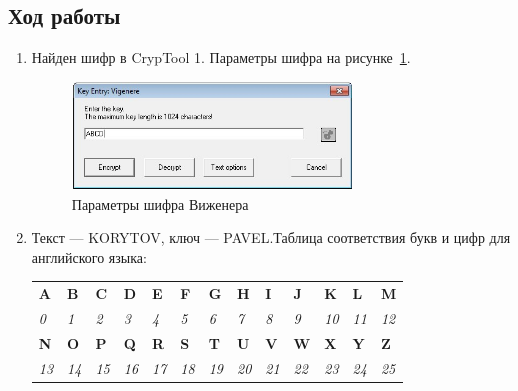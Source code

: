 \documentclass[a4paper, 14pt]{extarticle}
\begin{document}
\subsection{Ход работы}
\begin{enumerate}
    \item Найден шифр в CrypTool 1. Параметры шифра на рисунке~\ref{img:3:1}.
    \begin{figure}[h]
        \centering
        \includegraphics[width=0.7\textwidth]{./img/S010.jpg}
        \caption{Параметры шифра Виженера}%
        \label{img:3:1}
    \end{figure}
    
    \item Текст --- KORYTOV, ключ --- PAVEL.\@ Таблица соответствия букв и цифр для английского языка:\@
    \begin{table}[h]
        \centering
        \begin{tabular}{@{}lllllllllllll@{}}
        \toprule
        \textbf{A} & \textbf{B} & \textbf{C} & \textbf{D} & \textbf{E} & \textbf{F} & \textbf{G} & \textbf{H} & \textbf{I} & \textbf{J} & \textbf{K} & \textbf{L} & \textbf{M} \\
        \textit{0} & \textit{1} & \textit{2} & \textit{3} & \textit{4} & \textit{5} & \textit{6} & \textit{7} & \textit{8} & \textit{9} & \textit{10} & \textit{11} & \textit{12} \\ \midrule
        \textbf{N} & \textbf{O} & \textbf{P} & \textbf{Q} & \textbf{R} & \textbf{S} & \textbf{T} & \textbf{U} & \textbf{V} & \textbf{W} & \textbf{X} & \textbf{Y} & \textbf{Z} \\
        \textit{13} & \textit{14} & \textit{15} & \textit{16} & \textit{17} & \textit{18} & \textit{19} & \textit{20} & \textit{21} & \textit{22} & \textit{23} & \textit{24} & \textit{25} \\ \bottomrule
        \end{tabular}
    \end{table}
    

\end{enumerate}
\end{document}
